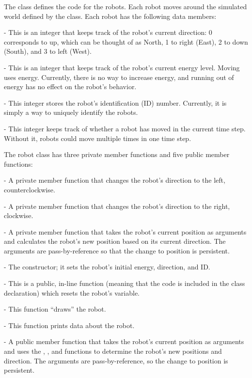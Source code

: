 The  class defines the code for the robots.  Each robot moves around the simulated world defined by the  class.  Each robot has the following data members:
\begin{tight_enumerate}
\item {} - This is an integer that keeps track of the robot's current direction: 0 corresponds to up, which can be thought of as North, 1 to right (East), 2 to down (South), and 3 to left (West).
\item {} - This is an integer that keeps track of the robot's current energy level.  Moving uses energy.  Currently, there is no way to increase energy, and running out of energy has no effect on the robot's behavior.
\item {} - This  integer stores the robot's identification (ID) number.  Currently, it is simply a way to uniquely identify the robots.
\item {} - This integer keeps track of whether a robot has moved in the current time step.  Without it, robots could move multiple times in one time step.
\end{tight_enumerate}

The robot class has three private member functions and five public member functions:
\begin{tight_enumerate}
\item {} - A private member function that changes the robot's direction to the left, counterclockwise.
\item {} - A private member function that changes the robot's direction to the right, clockwise.
\item {} - A private member function that takes the robot's current position as arguments and calculates the robot's new position based on its current direction.  The arguments are pass-by-reference so that the change to position is persistent.
\item {} - The constructor; it sets the robot's initial energy, direction, and ID.
\item {} - This is a public, in-line function (meaning that the code is included in the class declaration) which resets the robot's  variable.
\item {} - This function ``draws'' the robot.
\item {} - This function prints data about the robot.
\item {} - A public member function that takes the robot's current position as arguments and uses the , , and  functions to determine the robot's new positions and direction.   The arguments are pass-by-reference, so the change to position is persistent.
\end{tight_enumerate}

